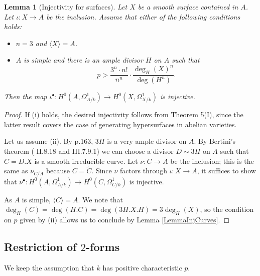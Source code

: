 \documentclass[11pt]{amsart}
\newtheorem{lemma}[theorem]{Lemma}
\theoremstyle{remark}
\numberwithin{equation}{section}
\begin{document}
\begin{lemma}[Injectivity for surfaces]\label{LemmaInjSurfaces} Let $X$ be a smooth surface contained in $A$. Let $\iota:X\to A$ be the inclusion. Assume that either of the following conditions holds:
\begin{itemize}
\item[(i)] $n=3$ and $\langle X \rangle =A$.
\item[(ii)] $A$ is simple and there is an ample divisor $H$ on $A$ such that 
$$
p>\frac{3^n\cdot n!}{n^n}\cdot \frac{\deg_H(X)^n}{\deg(H^n)}.
$$
\end{itemize}
Then the map  $\iota^\bullet : H^0(A,\Omega^1_{A/k})\to H^0(X,\Omega^1_{X/k})$ is injective.
\end{lemma}
\begin{proof} If (i) holds, the desired injectivity follows from \cite{NakaiOThDifAlgVar} Theorem 5(I), since the latter result covers the case of generating hypersurfaces in abelian varieties. 

Let us assume (ii). By \cite{Mumford} p.163, $3H$ is a very ample divisor on $A$.  By Bertini's theorem (\cite{Hartshorne} II.8.18 and III.7.9.1) we can choose a divisor $D\sim 3H$ on $A$ such that $C=D.X$ is a smooth irreducible curve. Let $\nu : C\to A$ be the inclusion; this is the same as $\nu_{C/A}$ because $C=\widetilde{C}$. Since $\nu$ factors through $\iota:X\to A$, it suffices to show that $\nu^\bullet : H^0(A,\Omega^1_{A/k})\to H^0(C,\Omega^1_{C/k})$ is injective. 

As $A$ is simple, $\langle C\rangle =A$. We note that $\deg_H(C) =\deg(H.C)= \deg(3H.X.H)=3\deg_H(X)$, so the condition on $p$ given by (ii) allows us to conclude by Lemma \ref{LemmaInjCurves}.
\end{proof}


\subsection{Restriction of $2$-forms} We keep the assumption that $k$ has positive characteristic $p$.
\end{document}
